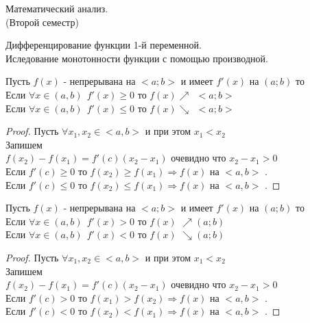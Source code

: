 \begin{title}
  Математический анализ.\\
  (Второй семестр)
\end{title}

\begin{title}
  Дифференцирование функции 1-й переменной.\\
  Иследование монотонности функции с помощью производной.
\end{title}

\begin{theorem}
  Пусть $f(x)$ - непрерывана на $<a; b>$ и имеет $f'(x)$ на $(a;b)$ то
  \\
  Если $\forall x \in (a,b) ~~ f'(x) \ge 0 $ то $f(x) \nearrow ~~ <a; b>$\\
  Если $\forall x \in (a,b) ~~ f'(x) \le 0 $ то $f(x) \searrow ~~ <a; b>$
\end{theorem}

\begin{proof}
  Пусть $\forall x_1, x_2 \in <a,b>$ и при этом $x_1 < x_2 $\\
  Запишем \\
  $f(x_2) - f(x_1) = f'(c)(x_2 - x_1)$ очевидно что $x_2 - x_1 > 0 $\\
  Если $f'(c) \ge 0$ то $f(x_2) \ge f(x_1) \Rightarrow f(x)$ на $<a,b>$
  .\\
  Если $f'(c) \le 0$ то $f(x_2) \le f(x_1) \Rightarrow f(x)$ на $<a,b>$
  .
\end{proof}

\begin{theorem}
  Пусть $f(x)$ - непрерывана на $<a; b>$ и имеет $f'(x)$ на $(a;b)$ то\\
  Если $\forall x \in (a, b) ~~ f'(x) > 0$ то $f(x)$ 
  $\nearrow (a; b)$\\
  Если $\forall x \in (a, b) ~~ f'(x) < 0$ то $f(x)$ 
  $\searrow (a; b)$
\end{theorem}

\begin{proof}
  Пусть $\forall x_1, x_2 \in <a,b>$ и при этом $x_1 < x_2 $\\
  Запишем \\
  $f(x_2) - f(x_1) = f'(c)(x_2 - x_1)$ очевидно что $x_2 - x_1 > 0$\\
  Если $f'(c) > 0$ то $f(x_1) > f(x_2) \Rightarrow f(x)$ на $<a,b>$
  .\\
  Если $f'(c) < 0$ то $f(x_2) < f(x_1) \Rightarrow f(x)$ на $<a,b>$
  .
\end{proof}

